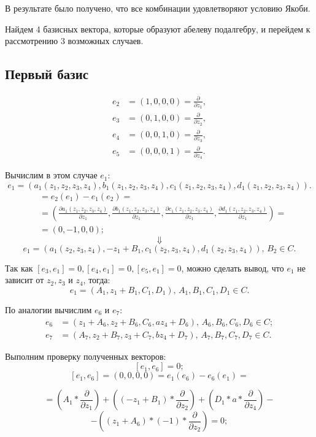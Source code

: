 \documentclass[12pt]{article}
\begin{document}
В результате было получено, что все комбинации удовлетворяют условию Якоби.

Найдем 4 базисных вектора, которые образуют абелеву подалгебру, и перейдем к рассмотрению 3 возможных случаев. \\

\subsection{Первый базис}
\begin{align*}
e_2 &= (1,0,0,0) = \frac{\partial}{\partial z_1}, \\
e_3 &= (0,1,0,0) = \frac{\partial}{\partial z_2}, \\
e_4 &= (0,0,1,0) = \frac{\partial}{\partial z_3}, \\
e_5 &= (0,0,0,1) = \frac{\partial}{\partial z_4}. 
\end{align*}

Вычислим в этом случае $e_1$:
$$e_1 = (a_1(z_1,z_2,z_3,z_4), b_1(z_1,z_2,z_3,z_4), c_1(z_1,z_2,z_3,z_4), d_1(z_1,z_2,z_3,z_4)).$$ 
\begin{align*}
[e_2,e_1] &= e_2(e_1) - e_1(e_2) = \\
&= \left(
\frac{\partial a_1(z_1,z_2,z_3,z_4)}{\partial z_1}, 
\frac{\partial b_1(z_1,z_2,z_3,z_4)}{\partial z_1}, 
\frac{\partial c_1(z_1,z_2,z_3,z_4)}{\partial z_1},
\frac{\partial d_1(z_1,z_2,z_3,z_4)}{\partial z_1}
\right) = \\
& = (0,-1,0,0);
\end{align*}
$$\Downarrow$$
$$e_1 = (a_1(z_2,z_3,z_4), -z_1 + B_1, c_1(z_2,z_3,z_4), d_1(z_2,z_3,z_4)), \, B_2 \in C.$$

Так как $[e_3,e_1] = 0, [e_4,e_1] = 0, [e_5,e_1] = 0$, можно сделать вывод, что $e_1$ не зависит от $z_2, z_3 \text{ и } z_4$, тогда: 
$$e_1 = (A_1, z_1 + B_1, C_1, D_1), \, A_1, B_1, C_1, D_1 \in C.$$ 

По аналогии вычислим $e_6 \text{ и } e_7$:
\begin{align*}
e_6 &= (z_1 + A_6, z_2 + B_6, C_6, az_4 + D_6), \, A_6, B_6, C_6, D_6 \in C; \\
e_7 &= (A_7, z_2 + B_7, z_3 + C_7, bz_4 + D_7), \, A_7, B_7, C_7, D_7 \in C.
\end{align*}

Выполним проверку полученных векторов:
\[
[e_1, e_6] = 0;
\]
\[
[e_1, e_6] = (0, 0, 0, 0) = e_1(e_6) - e_6(e_1) = 
\]

\[
= \left(A_1 * \frac{\partial}{\partial z_1}\right)
+ \left((-z_1 + B_1) * \frac{\partial}{\partial z_2}\right)
+ \left(D_1 * a * \frac{\partial}{\partial z_4}\right) -
\]
\[
- \left((z_1 + A_6) * (-1) * \frac{\partial}{\partial z_2}\right) = 0;
\]
\end{document}
